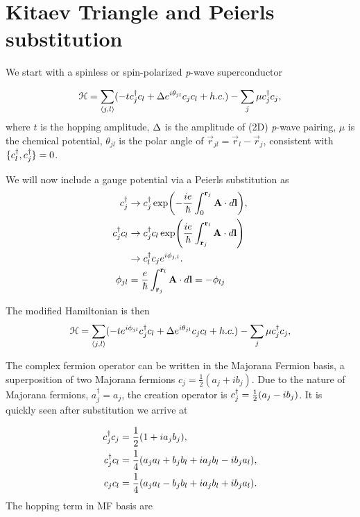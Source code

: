 \section{Kitaev Triangle and Peierls substitution}

We start with a spinless or spin-polarized \textit{p}-wave superconductor

\begin{equation}
  \mathcal{H} = \sum_{\langle j, l \rangle} (-tc^{\dagger}_{j} c_l + \Delta e^{i\theta_{jl}} c_{j} c_l + h.c.) - \sum_j \mu c^{\dagger}_j c_j,
\end{equation}
where $t$ is the hopping amplitude, $\Delta$  is the amplitude of (2D) \textit{p}-wave pairing, $\mu$ is the chemical potential, $\theta_{jl}$ is the polar angle of $\vec{r}_{jl} = \vec{r}_l - \vec{r}_j$, consistent with $\{c^{\dagger}_l, c^{\dagger}_j\} = 0$.

We will now include a gauge potential via a Peierls substitution as
\begin{align}\label{eq:HBdG}
  c^{\dagger}_j &\rightarrow c^{\dagger}_j \exp(-\dfrac{i e}{\hbar} \int_0^{\mathbf{r}_j} \mathbf{A} \cdot d\mathbf{l}), \nonumber \\
  c^{\dagger}_j c_l &\rightarrow c^{\dagger}_j c_l \exp(\dfrac{i e}{\hbar} \int_{\mathbf{r}_j}^{\mathbf{r}_l} \mathbf{A} \cdot d\mathbf{l}) \nonumber \\
  &\rightarrow c^{\dagger}_l c_j e^{i \phi_{j,l}}. \nonumber \\
  \phi_{jl} &= \dfrac{e}{\hbar} \int_{\mathbf{r}_j}^{\mathbf{r}_l} \mathbf{A} \cdot d\mathbf{l} = -\phi_{lj}
\end{align}

The modified Hamiltonian is then
\begin{equation}
  \mathcal{H} = \sum_{\langle j, l \rangle} (-t e^{i\phi_{jl}} c^{\dagger}_{j} c_l + \Delta e^{i\theta_{jl}} c_{j} c_l + h.c.) - \sum_j \mu c^{\dagger}_j c_j,
\end{equation}

The complex fermion operator can be written in the Majorana Fermion basis, a superposition of two Majorana fermions $c_j = \frac{1}{2} (a_j + i b_j)$.
Due to the nature of Majorana fermions, $a^{\dagger}_j = a_j$, the creation operator is $c^{\dagger}_j = \frac{1}{2} (a_j - i b_j)$.
It is quickly seen after substitution we arrive at

\begin{align}
  c^{\dagger}_j c_j &= \frac{1}{2} (1 + i a_j b_j), \\
  c^{\dagger}_j c_l &= \frac{1}{4} (a_j a_l + b_j b_l + i a_j b_l - i b_j a_l), \\
  c_j c_l &= \frac{1}{4} (a_j a_l - b_j b_l + i a_j b_l + i b_j a_l).
\end{align}
The hopping term in MF basis are


